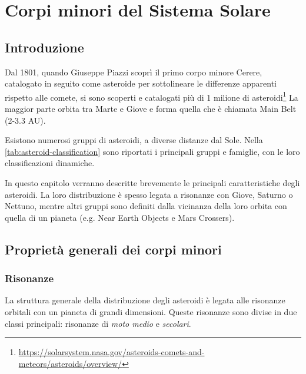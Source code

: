\documentclass[a4paper,11pt,openright]{book}
\begin{document}
\tableofcontents

\listoftables

\listoffigures


\mainmatter

\chapter{Corpi minori del Sistema Solare}\label{ch:ch_1}

\section{Introduzione}

Dal 1801, quando Giuseppe Piazzi scoprì il primo corpo minore Cerere, catalogato in seguito come asteroide per sottolineare le differenze apparenti rispetto alle comete, si sono scoperti e catalogati più di 1 milione di asteroidi\footnote{\href{https://solarsystem.nasa.gov/asteroids-comets-and-meteors/asteroids/overview/}{https://solarsystem.nasa.gov/asteroids-comets-and-meteors/asteroids/overview/}} La maggior parte orbita tra Marte e Giove e forma quella che è chiamata Main Belt (2-3.3 AU).

Esistono numerosi gruppi di asteroidi, a diverse distanze dal Sole. Nella \cref{tab:asteroid-classification} sono riportati i principali gruppi e famiglie, con le loro classificazioni dinamiche.

In questo capitolo verranno descritte brevemente le principali caratteristiche degli asteroidi. La loro distribuzione è spesso legata a risonanze con Giove, Saturno o Nettuno, mentre altri gruppi sono definiti dalla vicinanza della loro orbita con quella di un pianeta (e.g. Near Earth Objects e Mars Crossers).

\section{Proprietà generali dei corpi minori}


\subsection{Risonanze}
La struttura generale della distribuzione degli asteroidi è legata alle risonanze orbitali con un pianeta di grandi dimensioni. Queste risonanze sono divise in due classi principali: risonanze di \textit{moto medio} e \textit{secolari}.
\end{document}
